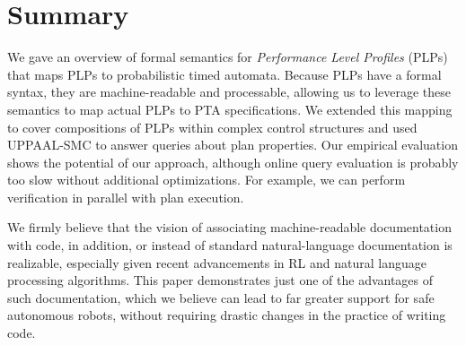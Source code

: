 \documentclass[letterpaper]{article}
\begin{document}
\section{Summary}
We gave an overview of formal semantics for {\em Performance Level Profiles\/} (PLPs) that maps PLPs to probabilistic timed automata. Because PLPs have a formal syntax, they are machine-readable and processable, allowing us to leverage these semantics to map actual PLPs to PTA specifications. We extended this mapping to cover compositions of PLPs within complex control structures and used UPPAAL-SMC to answer queries about plan properties.
Our empirical evaluation shows the potential of our approach, although
 online query evaluation is probably too slow without additional optimizations. For example, we can perform verification in parallel with plan execution.

We firmly believe that the vision of associating machine-readable documentation with code, in addition, or instead of standard natural-language documentation is realizable, especially given recent advancements in RL and natural language processing algorithms. This paper demonstrates just one of the advantages of such documentation, which
we believe can lead to far greater support for safe autonomous robots,
without requiring drastic changes in the practice of writing code.
\end{document}
